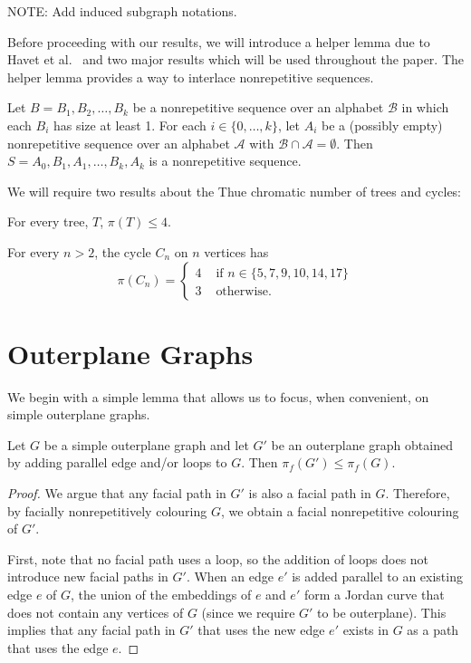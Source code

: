 \documentclass{patmorin}
\begin{document}
NOTE: Add induced subgraph notations.


Before proceeding with our results, we will introduce a helper lemma
due to Havet et al.~\cite{havet2011facial} and two major results which
will be used throughout the paper. The helper lemma provides a way to
interlace nonrepetitive sequences.

\begin{lem}
 Let $B=B_1,B_2,\ldots,B_k$ be a nonrepetitive sequence over an alphabet $\mathcal{B}$ in which each $B_i$ has size at least 1. For each $i \in \{0,\ldots,k\}$, let $A_i$ be a (possibly empty) nonrepetitive sequence over an alphabet $\mathcal{A}$ with $\mathcal{B} \cap \mathcal{A} = \emptyset$. Then
 $S = A_0, B_1, A_1, \ldots, B_k, A_k$ is a nonrepetitive sequence.
\end{lem}

We will require two results about the Thue chromatic number of trees and cycles:

\begin{thm}
 For every tree, $T$, $\pi(T) \leq 4$.
\end{thm}

\begin{thm}
 For every $n>2$, the cycle $C_n$ on $n$ vertices has
 \[
 \pi(C_n) = \begin{cases}
             4 & \text{ if } n \in \{5,7,9,10,14,17\} \\
             3 & \text{ otherwise. }
            \end{cases}
 \]
\end{thm}

\section{Outerplane Graphs}

We begin with a simple lemma that allows us to focus, when convenient,
on simple outerplane graphs.

\begin{lem}
  Let $G$ be a simple outerplane graph and let $G'$ be an outerplane graph obtained by adding parallel edge and/or loops to $G$.  Then $\pi_f(G')\le\pi_f(G)$.
\end{lem}

\begin{proof}
   We argue that any facial path in $G'$ is also a facial path in $G$.
   Therefore, by facially nonrepetitively colouring $G$, we obtain a facial
   nonrepetitive colouring of $G'$.

   First, note that no facial path uses a loop, so the addition of
   loops does not introduce new facial paths in $G'$.  When an edge
   $e'$ is added parallel to an existing edge $e$ of $G$, the union
   of the embeddings of $e$ and $e'$ form a Jordan curve that does not
   contain any vertices of $G$ (since we require $G'$ to be outerplane).
   This implies that any facial path in $G'$ that uses the new edge $e'$
   exists in $G$ as a path that uses the edge $e$.
\end{proof}
\end{document}
